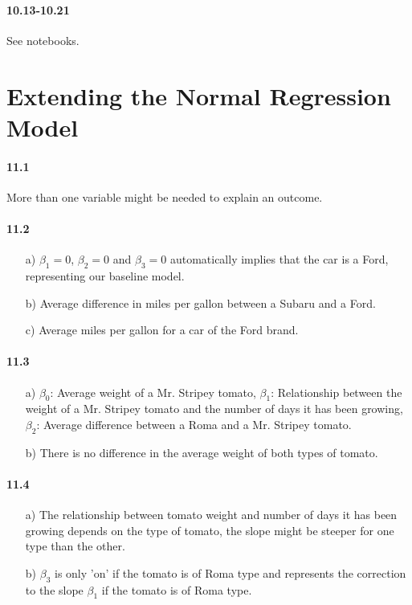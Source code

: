 \documentclass[fontsize=11pt,DIV=18,parskip=half]{scrartcl}
\begin{document}
\paragraph{10.13-10.21} See notebooks.

\section{Extending the Normal Regression Model}

\paragraph{11.1} More than one variable might be needed to explain an outcome.

\paragraph{11.2}
\begin{itemize}
\item[a)] $\beta_1=0$, $\beta_2=0$ and $\beta_3=0$ automatically implies that the car is a Ford, representing our baseline model.
\item[b)] Average difference in miles per gallon between a Subaru and a Ford.
\item[c)] Average miles per gallon for a car of the Ford brand.
\end{itemize}

\paragraph{11.3}
\begin{itemize}
\item[a)] $\beta_0$: Average weight of a Mr. Stripey tomato, $\beta_1$: Relationship between the weight of a Mr. Stripey tomato and the number of days it has been growing, $\beta_2$: Average difference between a Roma and a Mr. Stripey tomato.
\item[b)] There is no difference in the average weight of both types of tomato.
\end{itemize}

\paragraph{11.4}
\begin{itemize}
\item[a)] The relationship between tomato weight and number of days it has been growing depends on the type of tomato, the slope might be steeper for one type than the other.
\item[b)] $\beta_3$ is only 'on' if the tomato is of Roma type and represents the correction to the slope $\beta_1$ if the tomato is of Roma type.
\end{itemize}
\end{document}
